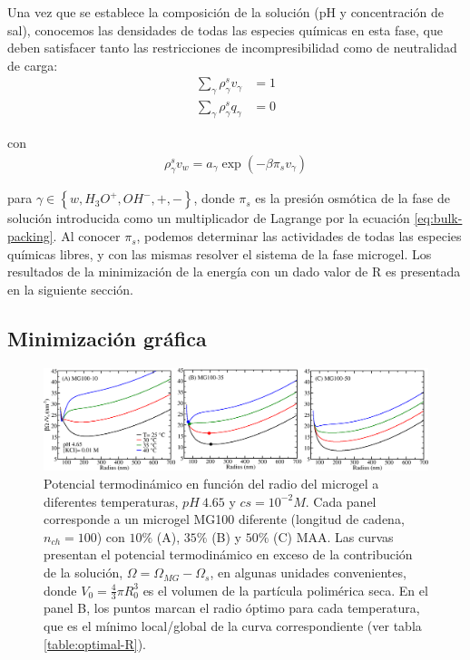 Una vez que se establece la composición de la soluci\'on (pH y concentraci\'on de sal), conocemos las densidades de todas las especies qu\'imicas en esta fase, que deben satisfacer tanto las restricciones de incompresibilidad como de neutralidad de carga:
%
%
\begin{align}
\sum_{\gamma  } \rho_\gamma^s v_\gamma  &=1\label{eq:bulk-packing}\\
\sum_{\gamma  } \rho_\gamma^s q_\gamma  &=0
\end{align}

\noindent con
%
%
\begin{align}
\rho_\gamma^s v_w= a_\gamma \exp(-\beta\pi_s v_\gamma)
\label{eq:bulk-electroneutrality}
\end{align}



\noindent para $\gamma \in \left\{ w, H_3O^+, OH^-, +,- \right\}$, donde $\pi_s$ es la presi\'on osm\'otica de la fase de soluci\'on introducida como un multiplicador de Lagrange por la ecuaci\'on \ref{eq:bulk-packing}.
Al conocer $\pi_s$, podemos determinar las actividades de todas las especies qu\'imicas libres, y con las mismas resolver el sistema de la fase microgel.
Los resultados de la minimizaci\'on de la energ\'ia con un dado valor de R es presentada en la siguiente secci\'on.

\subsection{Minimizaci\'on gr\'afica}\label{sec:gel:minimi}

\begin{figure}[!htb]
\centering
\includegraphics[width=1.\linewidth]{Figures/graph-gel/graph-min.png}
\caption{Potencial termodin\'amico en funci\'on del radio del microgel a diferentes temperaturas, $pH~4.65$ y $cs=10^{-2}M$.
	Cada panel corresponde a un microgel MG100 diferente (longitud de cadena, $n_{ch}=100$) con $10\%$ (A), $35\%$ (B) y $50\%$ (C) MAA.
	Las curvas presentan el potencial termodin\'amico en exceso de la contribuci\'on de la soluci\'on, $\Omega=\Omega_{MG}-\Omega_s$, en algunas unidades convenientes, donde $V_0=\frac{4}{3}\pi R_0^3$ es el volumen de la part\'icula polim\'erica seca.
	En el panel B, los puntos  marcan el radio \'optimo para cada temperatura, que es el m\'inimo local/global de la curva correspondiente (ver tabla \ref{table:optimal-R}).}
\label{fig:graph-min}
\end{figure}

